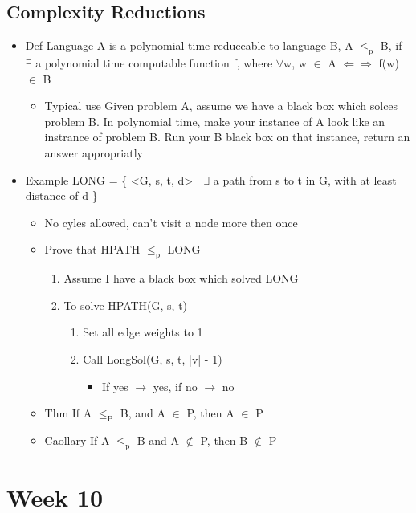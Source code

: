 \documentclass[11pt]{article}
\begin{document}
\subsection{Complexity Reductions}
\label{sec:orgb09205f}
\begin{itemize}
\item Def
Language A is a polynomial time reduceable to language B, A \(\le_{\text{p}}\) B, if \(\exists\) a polynomial time computable function f, 
where \(\forall\)w, w \(\in\) A \(\Leftarrow \Rightarrow\) f(w) \(\in\) B
\begin{itemize}
\item Typical use
Given problem A, assume we have a black box which solces problem B. In polynomial time, make your instance of A
look like an instrance of problem B. Run your B black box on that instance, return an answer appropriatly
\end{itemize}
\item Example
LONG = \{ <G, s, t, d> | \(\exists\) a path from s to t in G, with at least distance of d \} 
\begin{itemize}
\item No cyles allowed, can't visit a node more then once
\item Prove that HPATH \(\le_{\text{p}}\) LONG
\begin{enumerate}
\item Assume I have a black box which solved LONG
\item To solve HPATH(G, s, t)
\begin{enumerate}
\item Set all edge weights to 1
\item Call LongSol(G, s, t, |v| - 1)
\begin{itemize}
\item If yes \(\rightarrow\) yes, if no \(\rightarrow\) no
\end{itemize}
\end{enumerate}
\end{enumerate}
\end{itemize}
\begin{itemize}
\item Thm
If A \(\le_{\text{P}}\) B, and A \(\in\) P, then A \(\in\) P
\item Caollary
If A \(\le_{\text{p}}\) B and A \(\notin\) P, then B \(\notin\) P
\end{itemize}
\end{itemize}
\section{Week 10}
\label{sec:org8575b47}
\end{document}
